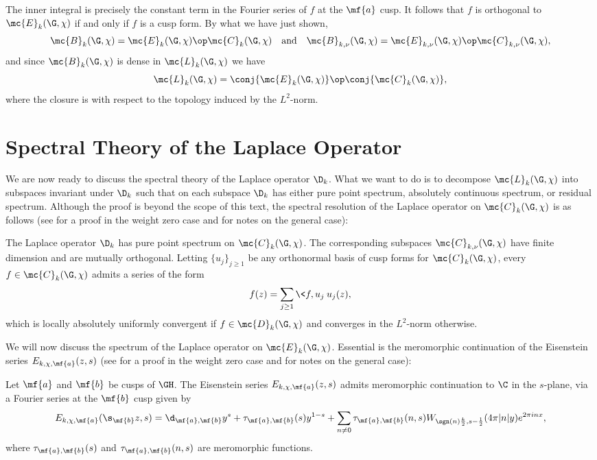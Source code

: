    The inner integral is precisely the constant term in the Fourier series of $f$ at the $\mf{a}$ cusp. It follows that $f$ is orthogonal to $\mc{E}_{k}(\G,\chi)$ if and only if $f$ is a cusp form. By what we have just shown,
    \[
      \mc{B}_{k}(\G,\chi) = \mc{E}_{k}(\G,\chi) \op \mc{C}_{k}(\G,\chi) \quad \text{and} \quad \mc{B}_{k,\nu}(\G,\chi) = \mc{E}_{k,\nu}(\G,\chi) \op \mc{C}_{k,\nu}(\G,\chi),
    \]
    and since $\mc{B}_{k}(\G,\chi)$ is dense in $\mc{L}_{k}(\G,\chi)$ we have
    \[
      \mc{L}_{k}(\G,\chi) = \conj{\mc{E}_{k}(\G,\chi)} \op \conj{\mc{C}_{k}(\G,\chi)},
    \]
    where the closure is with respect to the topology induced by the $L^{2}$-norm.
  \section{Spectral Theory of the Laplace Operator}
    We are now ready to discuss the spectral theory of the Laplace operator $\D_{k}$. What we want to do is to decompose $\mc{L}_{k}(\G,\chi)$ into subspaces invariant under $\D_{k}$ such that on each subspace $\D_{k}$ has either pure point spectrum, absolutely continuous spectrum, or residual spectrum. Although the proof is beyond the scope of this text, the spectral resolution of the Laplace operator on $\mc{C}_{k}(\G,\chi)$ is as follows (see \cite{iwaniec2002spectral} for a proof in the weight zero case and \cite{cohenmodular2017} for notes on the general case):

    \begin{theorem}\label{thm:cusp_form_spectrum}
      The Laplace operator $\D_{k}$ has pure point spectrum on $\mc{C}_{k}(\G,\chi)$. The corresponding subspaces $\mc{C}_{k,\nu}(\G,\chi)$ have finite dimension and are mutually orthogonal. Letting $\{u_{j}\}_{j \ge 1}$ be any orthonormal basis of cusp forms for $\mc{C}_{k}(\G,\chi)$, every $f \in \mc{C}_{k}(\G,\chi)$ admits a series of the form
      \[
        f(z) = \sum_{j \ge 1}\<f,u_{j}\>u_{j}(z),
      \]
      which is locally absolutely uniformly convergent if $f \in \mc{D}_{k}(\G,\chi)$ and converges in the $L^{2}$-norm otherwise.
    \end{theorem}

    We will now discuss the spectrum of the Laplace operator on $\mc{E}_{k}(\G,\chi)$. Essential is the meromorphic continuation of the Eisenstein series $E_{k,\chi,\mf{a}}(z,s)$ (see \cite{iwaniec2002spectral} for a proof in the weight zero case and \cite{cohenmodular2017} for notes on the general case):

    \begin{theorem}\label{thm:meromorphic_continuation_of_Eisenstein_series}
      Let $\mf{a}$ and $\mf{b}$ be cusps of $\GH$. The Eisenstein series $E_{k,\chi,\mf{a}}(z,s)$ admits meromorphic continuation to $\C$ in the $s$-plane, via a Fourier series at the $\mf{b}$ cusp given by
      \[
        E_{k,\chi,\mf{a}}(\s_{\mf{b}}z,s) = \d_{\mf{a},\mf{b}}y^{s}+\tau_{\mf{a},\mf{b}}(s)y^{1-s}+\sum_{n \neq 0}\tau_{\mf{a},\mf{b}}(n,s)W_{\sgn(n)\frac{k}{2},s-\frac{1}{2}}(4\pi|n|y)e^{2\pi inx},
      \]
      where $\tau_{\mf{a},\mf{b}}(s)$ and $\tau_{\mf{a},\mf{b}}(n,s)$ are meromorphic functions.
    \end{theorem}

